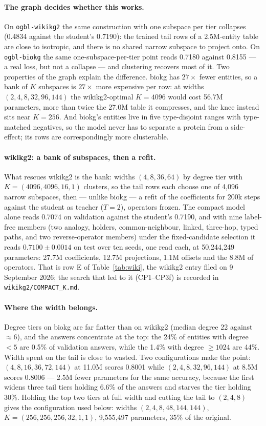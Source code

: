 \documentclass[11pt,a4paper]{article}
\begin{document}
\paragraph{The graph decides whether this works.} On
\texttt{ogbl-wikikg2} the same construction with one subspace per tier
collapses (0.4834 against the student's 0.7190): the trained tail rows of
a 2.5M-entity table are close to isotropic, and there is no shared narrow
subspace to project onto. On \texttt{ogbl-biokg} the same
one-subspace-per-tier point reads 0.7180 against 0.8155 --- a real loss,
but not a collapse --- and clustering recovers most of it. Two properties
of the graph explain the difference. biokg has $27\times$ fewer entities,
so a bank of $K$ subspaces is $27\times$ more expensive per row: at
widths $(2,4,8,32,96,144)$ the wikikg2-optimal $K=4096$ would cost 56.7M
parameters, more than twice the 27.0M table it compresses, and the knee
instead sits near $K=256$. And biokg's entities live in five
type-disjoint ranges with type-matched negatives, so the model never has
to separate a protein from a side-effect; its rows are correspondingly
more clusterable.

\paragraph{wikikg2: a bank of subspaces, then a refit.} What rescues
wikikg2 is the bank: widths $(4,8,36,64)$ by degree tier with
$K=(4096,4096,16,1)$ clusters, so the tail rows each choose one of 4{,}096
narrow subspaces, then --- unlike biokg --- a refit of the coefficients for
200k steps against the student as teacher ($T=2$), operators frozen. The
compact model alone reads 0.7074 on validation against the student's
0.7190, and with nine label-free members (two analogy, holders,
common-neighbour, linked, three-hop, typed paths, and two reverse-operator
members) under the fixed-candidate selection it reads
$0.7100\pm0.0014$ on test over ten seeds, one read each, at 50{,}244{,}249
parameters: 27.7M coefficients, 12.7M projections, 1.1M offsets and the
8.8M of operators. That is row E of Table~\ref{tab:wiki}, the wikikg2
entry filed on 9 September 2026; the search that led to it (CP1--CP3f) is recorded in
\texttt{wikikg2/COMPACT\_K.md}.

\paragraph{Where the width belongs.} Degree tiers on biokg are far
flatter than on wikikg2 (median degree 22 against $\approx6$), and the
answers concentrate at the top: the 24\% of entities with degree $<5$ are
0.5\% of validation answers, while the 1.4\% with degree $\geq 1024$ are
44\%. Width spent on the tail is close to wasted. Two configurations make
the point: $(4,8,16,36,72,144)$ at 11.0M scores 0.8001 while
$(2,4,8,32,96,144)$ at 8.5M scores 0.8006 --- 2.5M fewer parameters for
the same accuracy, because the first widens three tail tiers holding
6.6\% of the answers and starves the tier holding 30\%. Holding the top
two tiers at full width and cutting the tail to $(2,4,8)$ gives the
configuration used below: widths $(2,4,8,48,144,144)$,
$K=(256,256,256,32,1,1)$, 9{,}555{,}497 parameters, 35\% of the original.
\end{document}
